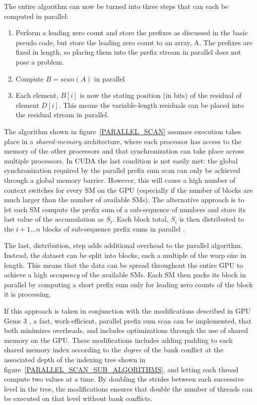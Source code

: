  The entire algorithm can now be turned into three steps that can each be computed in parallel:
 \begin{enumerate}
  \item Perform a leading zero count and store the prefixes as discussed in the basic pseudo code, but store the leading zero count to an array, A. The prefixes are fixed in length, so placing them
  into the prefix stream in parallel does not pose a problem.
  \item Compute $B = scan(A)$ in parallel
  \item Each element, $B[i]$ is now the stating position (in bits) of the residual of element $D[i]$. This means the variable-length residuals can be placed into the residual stream in parallel.
 \end{enumerate}
 
 The algorithm shown in figure~\ref{PARALLEL_SCAN} assumes execution takes place in a \textit{shared-memory} architecture, where each processor has access to the memory of the other processors and that synchronization
 can take place across multiple processors. In CUDA the last condition is not easily met: the global synchronization required by the parallel prefix sum scan can only be achieved through a global memory barrier. 
 However, this will cause a high number of context switches for every SM on the GPU (especially if the number of blocks are much larger than the number of available SMs). The alternative approach is to let each SM
 compute the prefix sum of a sub-sequence of numbers and store its last value of the accumulation as $S_{i}$. Each block total, $S_{i}$ is then distributed to the $i+1\dots n$ blocks of sub-sequence prefix sums in 
 parallel \cite{harris2007parallel}.
 
 The last, distribution, step adds additional overhead to the parallel algorithm. Instead, the dataset can be split into blocks, each a multiple of the warp size in length. This means that the data can be
 spread throughout the entire GPU to achieve a high \textit{occupancy} of the available SMs. Each SM then packs its block in parallel by computing a short prefix sum only for leading zero counts of the block 
 it is processing. 
 
 If this approach is taken in conjunction with the modifications described in GPU Gems 3 \cite{harris2007parallel}, a fast, work-efficient, parallel prefix sum scan can be implemented, that both minimizes overheads, and 
 includes optimizations through the use of shared memory on the GPU. These modifications includes adding padding  to each shared memory index according to the \textit{degree} of the bank conflict at the associated 
 depth of the indexing tree shown in figure~\ref{PARALLEL_SCAN_SUB_ALGORITHMS}, and letting each thread compute two values at a time. By doubling the strides between each successive level in the tree, the modifications 
 ensures that double the number of threads can be executed on that level without bank conflicts. 
 
